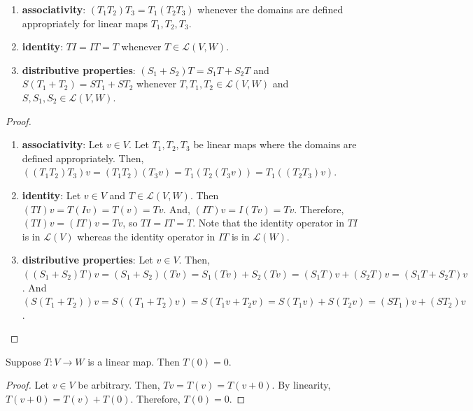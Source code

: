 \documentclass{article}
\begin{document}
\begin{theorem}
  \label{thm:properties-of-products-of-linear-maps}
  \leavevmode
  \begin{enumerate}
    \item \textbf{associativity}: $(T_1 T_2) T_3 = T_1 (T_2 T_3)$
      whenever the domains are defined appropriately for linear maps
      $T_1, T_2, T_3$.
    \item \textbf{identity}: $TI = IT = T$ whenever $T \in
      \mathcal{L}(V, W)$.
    \item \textbf{distributive properties}: $(S_1 + S_2)T = S_1 T +
      S_2 T$ and $S(T_1 + T_2) = ST_1 + ST_2$ whenever $T, T_1, T_2
      \in \mathcal{L}(V, W)$ and $S, S_1, S_2 \in \mathcal{L}(V, W)$.
  \end{enumerate}
\end{theorem}
\begin{proof}
  \leavevmode
  \begin{enumerate}
    \item \textbf{associativity}: Let $v \in V$. Let $T_1, T_2, T_3$
      be linear maps where the domains are defined
      appropriately. Then, $((T_1 T_2)T_3)v = (T_1 T_2)(T_3 v) =
      T_1(T_2(T_3 v)) = T_1((T_2 T_3) v)$.
    \item \textbf{identity}: Let $v \in V$ and $T \in \mathcal{L}(V,
      W)$. Then $(TI)v = T(Iv) = T(v) = Tv$. And, $(IT)v = I(Tv) =
      Tv$. Therefore, $(TI)v = (IT)v = Tv$, so $TI = IT = T$. Note
      that the identity operator in $TI$ is in $\mathcal{L}(V)$
      whereas the identity operator in $IT$ is in $\mathcal{L}(W)$.
    \item \textbf{distributive properties}: Let $v \in V$. Then,
      $((S_1 + S_2)T)v = (S_1 + S_2)(Tv) = S_1(Tv) + S_2(Tv) = (S_1T)v
      + (S_2T)v = (S_1T + S_2T)v$. And $(S(T_1 + T_2))v = S((T_1 +
      T_2)v) = S(T_1v + T_2v) = S(T_1v) + S(T_2v) = (ST_1)v + (ST_2)v$.
      
  \end{enumerate}
\end{proof}

\begin{theorem}
  \label{thm:linear-maps-take-0-to-0}
  Suppose $T: V \rightarrow W$ is a linear map. Then $T(0) = 0$.
\end{theorem}
\begin{proof}
  Let $v \in V$ be arbitrary. Then, $Tv = T(v) = T(v + 0)$. By
  linearity, $T(v + 0) = T(v) + T(0)$. Therefore, $T(0) = 0$.
\end{proof}
\end{document}
